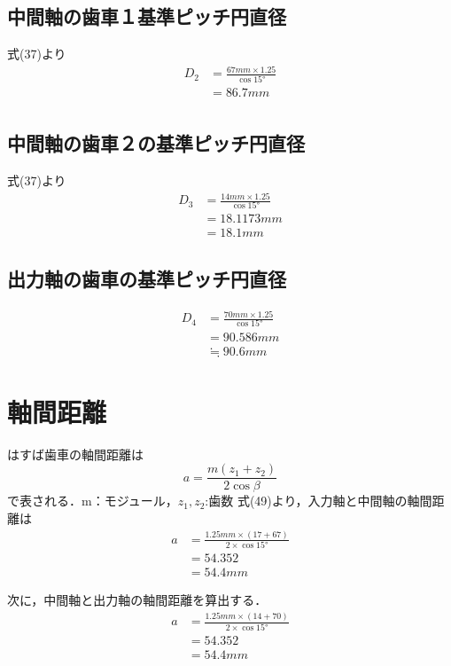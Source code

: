 \documentclass[a4paper,titlepage]{ltjsarticle}
\begin{document}
\subsection{中間軸の歯車１基準ピッチ円直径}
式(37)より
\begin{align}
	D_2&=\frac{67 {\si{mm}}\times1.25}{\cos\ang{15}}\\
	   &=86.7{ \si{mm}}\\
\end{align}

\subsection{中間軸の歯車２の基準ピッチ円直径}
式(37)より
\begin{align}
\label{}
D_3&=\frac{14{\si{mm}}\times 1.25}{\cos\ang{15}}\\
&=18.1173{\si{mm}}\\
&=18.1{\si{mm}}
\end{align}

\subsection{出力軸の歯車の基準ピッチ円直径}
\begin{align}
\label{}
D_4&=\frac{70{\si{mm}}\times1.25}{\cos\ang{15}}\\
   &=90.586{ \si{mm}}\\
   &\fallingdotseq 90.6 {\si{mm}}
\end{align}

\section{軸間距離}
はすば歯車の軸間距離は
\begin{equation}
\label{}
a=\frac{m(z_1+z_2)}{2\cos\beta }
\end{equation}
で表される．m：モジュール，$z_1,z_2$:歯数
式(49)より，入力軸と中間軸の軸間距離は
\begin{align}
\label{}
a&=\frac{1.25 {\si{mm}}\times(17+67)}{2\times \cos\ang{15}}\\
 &=54.352\\
 &=54.4 {\si{mm}}
\end{align}

次に，中間軸と出力軸の軸間距離を算出する．
\begin{align}
\label{}
a&=\frac{1.25{\si{mm}}\times(14+70)}{2\times \cos\ang{15}}\\
&=54.352\\
 &=54.4 {\si{mm}}
\end{align}
\end{document}
